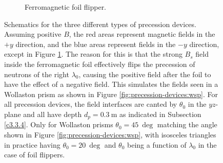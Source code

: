 \begin{figure}[htbp]
\begin{subfigure}[b]{0.3\textwidth}
		\caption{Ferromagnetic foil flipper.}
		\label{fig:precession-devices:foil}
	\end{subfigure}
	\caption{Schematics for the three different types of precession devices. Assuming positive $B$, the red areas represent magnetic fields in the $+y$ direction, and the blue areas represent fields in the $-y$ direction, except in Figure \ref{fig:precession-devices:foil}. The reason for this is that the strong $B_s$ field inside the ferromagnetic foil effectively flips the precession of neutrons of the right $\lambda_0$, causing the positive field after the foil to have the effect of a negative field. This simulates the fields seen in a Wollaston prism as shown in Figure \ref{fig:precession-devices:wsp}. For all precession devices, the field interfaces are canted by $\theta_0$ in the $yz$-plane and all have depth $d_p = \SI{0.3}{\meter}$ as indicated in Subsection \ref{c3.3.4}. Only for Wollaston prisms $\theta_0 = \SI{45}{\deg}$ matching the angle shown in Figure \ref{fig:precession-devices:wsp}, with isosceles triangles in practice having $\theta_0 = \SI{20}{\deg}$ and $\theta_0$ being a function of $\lambda_0$ in the case of foil flippers.}
	\label{fig:precession-devices}
\end{figure}

